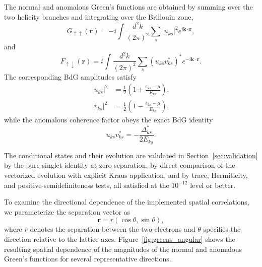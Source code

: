 \documentclass[aps,prb,twocolumn,superscriptaddress,longbibliography]{revtex4-2}
\begin{document}
The normal and anomalous Green's functions are obtained by summing
over the two helicity branches and integrating over the Brillouin zone,
%
\begin{equation}\boxed{
G_{\uparrow\uparrow}(\mathbf{r})
=
-i
\int \frac{d^2k}{(2\pi)^2}
\sum_s
|u_{ks}|^2
e^{i\mathbf{k}\cdot\mathbf{r}},
}\label{eq:G_normal}\end{equation}
%
and
%
\begin{equation}\boxed{
F_{\uparrow\downarrow}(\mathbf{r})
=
i
\int \frac{d^2k}{(2\pi)^2}
\sum_s
\left(u_{ks}v_{ks}^{*}\right)^{*}
e^{-i\mathbf{k}\cdot\mathbf{r}}.
}\label{eq:F_anomalous}\end{equation}
%
The corresponding BdG amplitudes satisfy
%
\begin{equation}\boxed{
\begin{aligned}
|u_{ks}|^2
&=
\frac{1}{2}
\left(
1+\frac{\epsilon_{ks}-\mu}{E_{ks}}
\right),
\\
|v_{ks}|^2
&=
\frac{1}{2}
\left(
1-\frac{\epsilon_{ks}-\mu}{E_{ks}}
\right),
\end{aligned}
}\label{eq:BdG_amplitudes}\end{equation}
%
while the anomalous coherence factor obeys the exact BdG identity
%
\begin{equation}\boxed{
u_{ks}v_{ks}^{*}
=
-\frac{\Delta_{ks}^{*}}{2E_{ks}}.
}\label{eq:coherence_factor}\end{equation}

The conditional states and their evolution are
validated in Section~\ref{sec:validation} by the pure-singlet identity at
zero separation, by direct comparison of the vectorized evolution with
explicit Kraus application, and by trace, Hermiticity, and
positive-semidefiniteness tests, all satisfied at the $10^{-12}$ level or
better.

To examine the directional dependence of the implemented spatial correlations,
we parameterize the separation vector as
%
\begin{equation}\boxed{
\mathbf{r}
=
r(\cos\theta,\sin\theta),
}\label{eq:r_parameterization}\end{equation}
%
where $r$ denotes the separation between the two electrons and
$\theta$ specifies the direction relative to the lattice axes.
Figure~\ref{fig:greens_angular} shows the resulting spatial dependence
of the magnitudes of the normal and anomalous Green's functions
for several representative directions.
\end{document}
